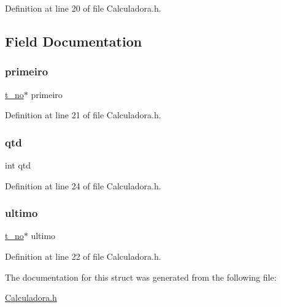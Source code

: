 Definition at line 20 of file Calculadora.\+h.



\subsection{Field Documentation}
\mbox{\label{structt__pilha_a7934aefd2d1b991f40c0aee790cbe816}} 
\subsubsection{\texorpdfstring{primeiro}{primeiro}}
{\footnotesize\ttfamily \mbox{\hyperlink{_calculadora_8h_a312f04dbe081fc59526dcf1463e3380a}{t\+\_\+no}}$\ast$ primeiro}



Definition at line 21 of file Calculadora.\+h.

\mbox{\label{structt__pilha_ab64e355d6f14927f41266ddfbf88ac91}} 
\subsubsection{\texorpdfstring{qtd}{qtd}}
{\footnotesize\ttfamily int qtd}



Definition at line 24 of file Calculadora.\+h.

\mbox{\label{structt__pilha_ac877288312a8aa6ba82eed564f15e022}} 
\subsubsection{\texorpdfstring{ultimo}{ultimo}}
{\footnotesize\ttfamily \mbox{\hyperlink{_calculadora_8h_a312f04dbe081fc59526dcf1463e3380a}{t\+\_\+no}}$\ast$ ultimo}



Definition at line 22 of file Calculadora.\+h.



The documentation for this struct was generated from the following file\+:\begin{DoxyCompactItemize}
\item 
\mbox{\hyperlink{_calculadora_8h}{Calculadora.\+h}}\end{DoxyCompactItemize}
